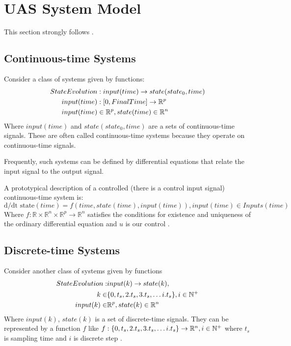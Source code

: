 \newpage
\section{UAS System Model}\label{s:uavMotionModel}
\noindent
This section strongly follows \cite{lee2011structure}.

\subsection{Continuous-time Systems}\noindent

\noindent Consider a class of systems given by functions:
\begin{equation}
    \begin{aligned}
    State Evolution &: input(time)  \to state(state_0,time) \\
    input(time)&: [0,FinalTime] \to \mathbb{R}^p \\
    input(time)&\in \mathbb{R}^p , state(time) \in \mathbb{R}^n \\
    \end{aligned}
\end{equation}
Where $input(time)$ and $state(state_0,time)$ are a sets of continuous-time signals. These are often called continuous-time systems because they operate on continuous-time signals. 

Frequently, such systems can be defined by differential equations that relate the input signal to the output signal.

A prototypical description of a controlled (there is a control input signal) continuous-time system is:
\begin{equation}\label{eq:nonlinearsystem}
    \text{d}/\text{d}\text{t state}(time) = f(time,state(time),input(time)), input(time) \in Inputs(time)
\end{equation}
Where $f:\mathbb{R}\times\mathbb{R}^n\times\mathbb{R}^p\to\mathbb{R}^n$ satisfies the conditions for existence and uniqueness of the ordinary differential equation and $u$ is our control \cite{butcher1987numerical}.

\subsection{Discrete-time Systems}
\noindent
\noindent Consider another class of systems given by functions
\begin{equation}\label{eq:Discretegenericuavmodel}
    \begin{aligned}
    State Evolution:& input(k)  \to state(k), \\
    k \in& \{0, t_s, 2.t_s, 3.t_s, \dots i.t_s\}, i \in \mathbb{N}^+\\
    input(k)\in& \mathbb{R}^p , state(k) \in \mathbb{R}^n\\
    \end{aligned}
\end{equation}
Where $input(k)$, $state(k)$ is a set of discrete-time signals. They can be represented by a function $f$ like $f:\{0, t_s, 2.t_s, 3.t_s, \dots i.t_s\} \to \mathbb{R}^n,  i \in \mathbb{N}^+$ where $t_s$ is sampling time and $i$ is discrete step \cite{shampine1997matlab}.

